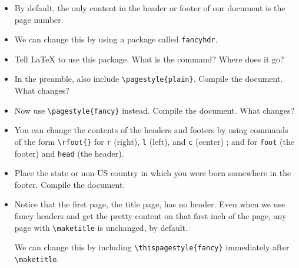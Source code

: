 \begin{itemize}

\item By default, the only content in the header or footer of our
  document is the page number.

\item We can change this by using a package called \texttt{fancyhdr}.

\item Tell \LaTeX{} to use this package. What is the command? Where
  does it go?

\item In the preamble, also include \verb=\pagestyle{plain}=.  Compile the
  document. What changes?

\item Now use \verb=\pagestyle{fancy}= instead. Compile the document. What
  changes?

\item You can change the contents of the headers and footers by using commands
  of the form \texttt{\textbackslash rfoot\{\}} for \texttt{r} (right),
  \texttt{l} (left), and \texttt{c} (center) ; and for \texttt{foot} (the
  footer) and \texttt{head} (the header).

\item Place the state or non-US country in which you were born somewhere in the
  footer. Compile the document.

\item Notice that the first page, the title page, has no header. Even when we
  use fancy headers and get the pretty content on that first inch of the page,
  any page with \verb=\maketitle= is unchanged, by default.

  We can change this by including \verb=\thispagestyle{fancy}= immediately after
  \verb=\maketitle=.
\end{itemize}


